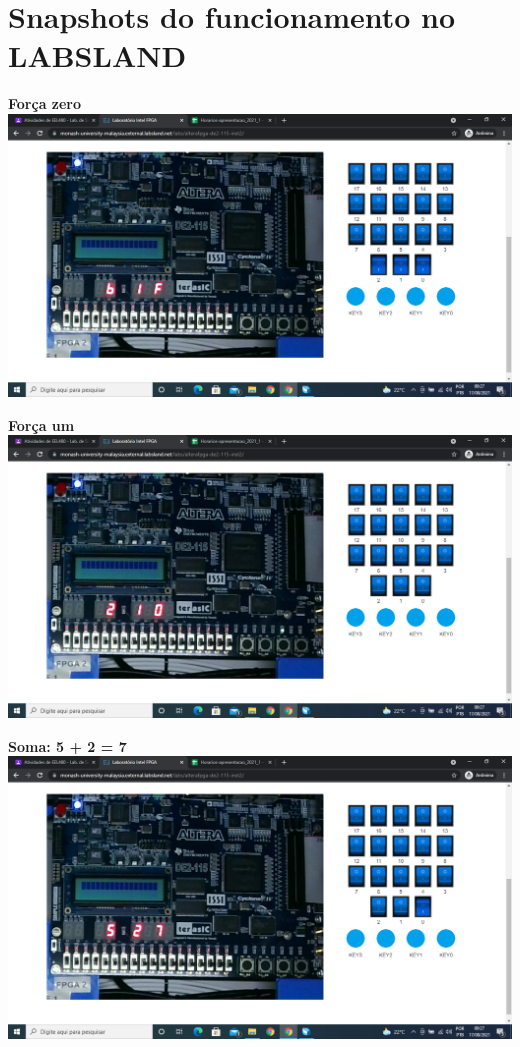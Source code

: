 \documentclass{article}
\begin{document}
\section{Snapshots do funcionamento no LABSLAND}




\begin{center}

\textbf{Força zero}
\includegraphics[width=\textwidth]{img/labsland_forca_1.png}

\textbf{Força um}
\includegraphics[width=\textwidth]{img/labsland_forca_zero.png}

\textbf{Soma: 5 + 2 = 7}
\includegraphics[width=\textwidth]{img/labsland_soma.png}


\end{center}
\end{document}
